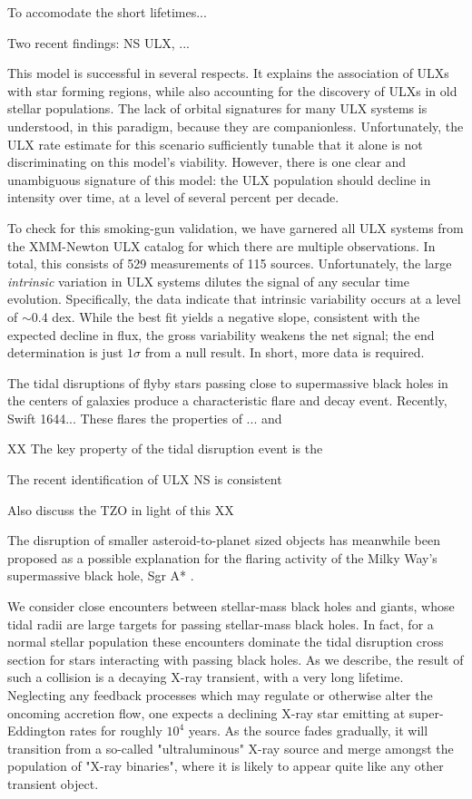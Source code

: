 To accomodate the short lifetimes... 


Two recent findings:  NS ULX, ...








This model is successful in several respects. It explains the
association of ULXs with star forming regions, while also accounting
for the discovery of ULXs in old stellar populations.  The
lack of orbital signatures for many ULX systems is understood, in this
paradigm, because they are companionless.  Unfortunately, the ULX rate
estimate for this scenario sufficiently tunable that it alone is not
discriminating on this model's viability.  However, there is one clear
and unambiguous signature of this model: the ULX population should
decline in intensity over time, at a level of several percent per
decade.

To check for this smoking-gun validation, we have garnered all ULX
systems from the \citet{Walton_2011} XMM-Newton ULX catalog for which
there are multiple observations.  In total, this consists of 529
measurements of 115 sources.  Unfortunately, the large {\em intrinsic}
variation in ULX systems dilutes the signal of any secular time
evolution.  Specifically, the data indicate that intrinsic variability
occurs at a level of $\sim0.4$ dex.  While the best fit yields a
negative slope, consistent with the expected decline in flux, the
gross variability weakens the net signal; the end determination is
just $1\sigma$ from a null result.  In short, more data is required.


The tidal disruptions of flyby stars passing close to supermassive
black holes in the centers of galaxies produce a characteristic 
flare and decay event.  Recently, Swift 1644...
These flares the properties of ... and 



XX
The key property of the tidal disruption event is the 

The recent identification of ULX NS is consistent 

Also discuss the TZO in light of this
XX


The disruption of smaller asteroid-to-planet sized objects has
meanwhile been proposed as a possible explanation for the flaring
activity of the Milky Way's supermassive black hole, Sgr A* \citep{SSS}.


We consider close encounters between stellar-mass black holes and giants, whose tidal radii are large targets for passing stellar-mass black holes.  In fact, for a normal stellar population these encounters dominate the tidal disruption cross section for stars interacting with passing black holes.  As we describe, the result of such a collision is a decaying X-ray transient, with a very long lifetime.  Neglecting any feedback processes which may regulate or otherwise alter the oncoming accretion flow, one expects a declining X-ray star emitting at super-Eddington rates for roughly $10^4$ years.  As the source fades gradually, it will transition from a so-called "ultraluminous" X-ray source and merge amongst the population of "X-ray binaries", where it is likely to appear quite like any other transient object. 

